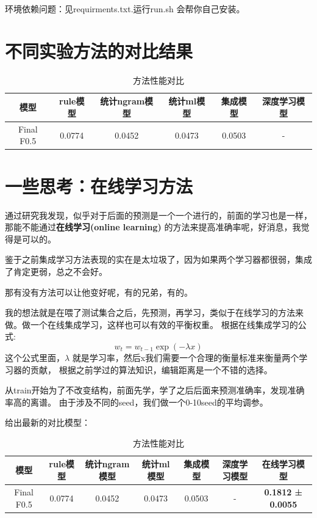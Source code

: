 \documentclass[answers]{exam}  %
\begin{document}
环境依赖问题：见requirments.txt.运行run.sh 会帮你自己安装。


\section{不同实验方法的对比结果}

\begin{table}[H]
    \centering
    \begin{tabular}{cccccc}
    \toprule
    \textbf{模型} & \textbf{rule模型} & \textbf{统计ngram模型} & \textbf{统计ml模型} & \textbf{集成模型} & \textbf{深度学习模型}\\
    \midrule
    Final F0.5 & 0.0774 & 0.0452 & 0.0473 & 0.0503 & - \\
    \bottomrule
    \end{tabular}
    \caption{方法性能对比}
    \end{table}

\section{一些思考：在线学习方法}

通过研究我发现，似乎对于后面的预测是一个一个进行的，前面的学习也是一样，那能不能通过\textbf{在线学习(online learning)}
的方法来提高准确率呢，好消息，我觉得是可以的。

鉴于之前集成学习方法表现的实在是太垃圾了，因为如果两个学习器都很弱，集成了肯定更弱，总之不会好。

那有没有方法可以让他变好呢，有的兄弟，有的。

我的想法就是在喂了测试集合之后，先预测，再学习，类似于在线学习的方法来做。做一个在线集成学习，这样也可以有效的平衡权重。
根据在线集成学习的公式:
\[ w_t = w_{t-1} \exp(-\lambda x) \]
这个公式里面，$\lambda$ 就是学习率，然后x我们需要一个合理的衡量标准来衡量两个学习器的贡献，
根据之前学过的算法知识，编辑距离是一个不错的选择。

从train开始为了不改变结构，前面先学，学了之后后面来预测准确率，发现准确率高的离谱。
由于涉及不同的seed，我们做一个0-10seed的平均调参。

给出最新的对比模型：

\begin{table}[h]
    \centering
    \begin{tabular}{ccccccc}
    \toprule
    \textbf{模型} & \textbf{rule模型} & \textbf{统计ngram模型} & \textbf{统计ml模型} & \textbf{集成模型} & \textbf{深度学习模型} &\textbf{在线学习模型}\\
    \midrule
    Final F0.5 & 0.0774 & 0.0452 & 0.0473 & 0.0503 & - & \textbf{0.1812 ± 0.0055} \\
    \bottomrule
    \end{tabular}
    \caption{方法性能对比}
    \end{table}
\end{document}
